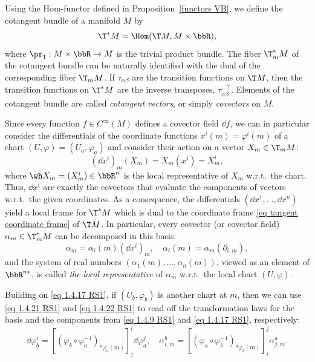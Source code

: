 \begin{defn}
    Using the Hom-functor defined in Proposition~\ref{functors VB}, we define the cotangent bundle of a manifold $M$ by 
    \[\T^\ast M=\Hom(\T M,M\times\bbR),\]
    where $\pr_1:M\times\bbR\to M$ is the trivial product bundle. The fiber $\T^\ast_m M$ of the cotangent bundle can be naturally identified with the dual of the corresponding fiber $\T_mM$. If $\tau_{\alpha\beta}$ are the transition functions on $\T M$, then the transition functions on $\T^\ast M$ are the inverse transposes, $\tau_{\alpha\beta}^{-\top}$. Elements of the cotangent bundle are called \emph{cotangent vectors}, or simply \emph{covectors} on $M$.
\end{defn}

Since every function $f\in C^\infty(M)$ defines a covector field $\dd f$, we can in particular consider the differentials of the coordinate functions $x^i(m)=\varphi^i(m)$ of a chart $(U,\varphi)=(U_a,\varphi_a)$ and consider their action on a vector $X_m\in \T_m M$:
\[(\dd x^i)_m(X_m)=X_m(x^i)=X_m^i,\label{eq 1.4.21 RS1}\]
where $\wh X_m=(X_m^i) \in \bbR^n$ is the local representative of $X_m$ w.r.t.\ the chart. Thus, $\dd x^i$ are exactly the covectors that evaluate the components of vectors w.r.t.\ the given coordinates. As a consequence, the differentials $(\dd x^1,\ldots,\dd x^n)$ yield a local frame for $\T^\ast M$ which is dual to the coordinate frame \eqref{eq tangent coordinate frame} of $\T M$. In particular, every covector (or covector field) $\alpha_m\in \T^\ast_m M$ can be decomposed in this basis:
\[\alpha_m=\alpha_i(m)(\dd x^i)_m,\quad \alpha_i(m)=\alpha_m(\partial_{i,m}),\label{eq 1.4.22 RS1}\]
and the system of real numbers $(\alpha_1(m),\ldots,\alpha_n(m))$, viewed as an element of $\bbR^{n\ast}$, is called \emph{the local representative} of $\alpha_m$ w.r.t.\ the local chart $(U,\varphi)$.

\begin{rem}
    Building on \eqref{eq 1.4.17 RS1}, if $(U_b,\varphi_b)$ is another chart at $m$, then we can use \eqref{eq 1.4.21 RS1} and \eqref{eq 1.4.22 RS1} to read off the transformation laws for the basis and the components from \eqref{eq 1.4.9 RS1} and \eqref{eq 1.4.17 RS1}, respectively:
    \[\dd \varphi_b^i=\left[\left(\varphi_b\circ\varphi_a^{-1}\right)_{\ast \varphi_a(m)}\right]^i_j \dd \varphi_a^j,\quad \alpha^b_{i,m}=\left[\left(\varphi_a\circ\varphi_b^{-1}\right)_{\ast \varphi_b(m)}\right]^j_i \alpha^a_{j,m}.\label{eq 1.4.23 RS1}\]
\end{rem}

